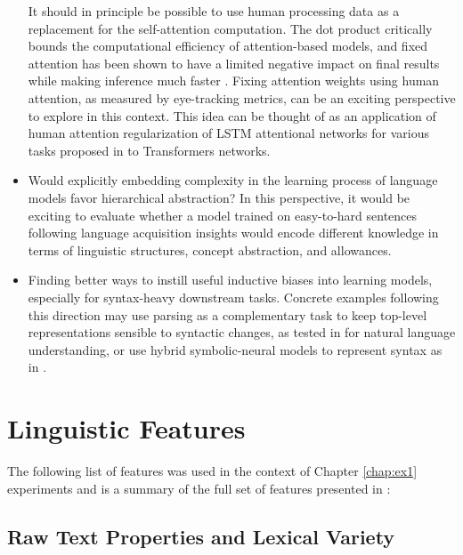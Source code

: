 \documentclass[a4paper, nobind]{templates/ociamthesis}
\begin{document}
\begin{itemize}
  It should in principle be possible to use human processing data as a replacement for the self-attention computation. The dot product critically bounds the computational efficiency of attention-based models, and fixed attention has been shown to have a limited negative impact on final results while making inference much faster \autocite{tay-etal-2020-synthesizer}. Fixing attention weights using human attention, as measured by eye-tracking metrics, can be an exciting perspective to explore in this context. This idea can be thought of as an application of human attention regularization of LSTM attentional networks for various tasks proposed in \textcite{barrett-etal-2018-sequence} to Transformers networks.
\item
  Would explicitly embedding complexity in the learning process of language models favor hierarchical abstraction? In this perspective, it would be exciting to evaluate whether a model trained on easy-to-hard sentences following language acquisition insights would encode different knowledge in terms of linguistic structures, concept abstraction, and allowances.
\item
  Finding better ways to instill useful inductive biases into learning models, especially for syntax-heavy downstream tasks. Concrete examples following this direction may use parsing as a complementary task to keep top-level representations sensible to syntactic changes, as tested in \textcite{glavas-vulic-2020-supervised} for natural language understanding, or use hybrid symbolic-neural models to represent syntax as in \textcite{zanzotto-etal-2020-kermit}.
\end{itemize}

\startappendices

\hypertarget{app:ling-feats}{%
\chapter{Linguistic Features}\label{app:ling-feats}}

The following list of features was used in the context of Chapter \ref{chap:ex1} experiments and is a summary of the full set of features presented in \textcite{brunato-etal-2020-profiling}:

\hypertarget{raw-text-properties-and-lexical-variety}{%
\section{Raw Text Properties and Lexical Variety}\label{raw-text-properties-and-lexical-variety}}
\end{document}
